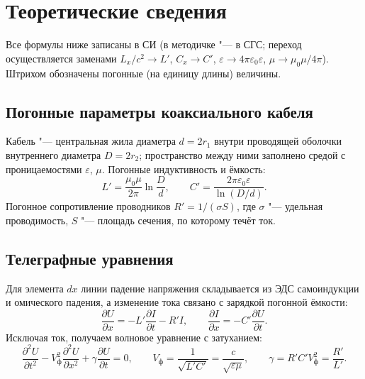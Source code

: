 \documentclass[a4paper,12pt]{article}
\begin{document}
\section{Теоретические сведения}

Все формулы ниже записаны в СИ (в методичке "--- в СГС; переход
осуществляется заменами $L_x/c^2\to L'$, $C_x\to C'$, $\varepsilon\to
4\pi\varepsilon_0\varepsilon$, $\mu\to\mu_0\mu/4\pi$). Штрихом обозначены
погонные (на единицу длины) величины.

\subsection{Погонные параметры коаксиального кабеля}
Кабель "--- центральная жила диаметра $d = 2r_1$ внутри проводящей оболочки
внутреннего диаметра $D = 2r_2$; пространство между ними заполнено средой
с проницаемостями $\varepsilon$, $\mu$. Погонные индуктивность и ёмкость:
\begin{equation}
    \label{eq:LC}
    L' = \frac{\mu_0\mu}{2\pi}\ln\frac{D}{d},
    \qquad
    C' = \frac{2\pi\varepsilon_0\varepsilon}{\ln(D/d)}.
\end{equation}
Погонное сопротивление проводников $R' = 1/(\sigma S)$, где $\sigma$ "---
удельная проводимость, $S$ "--- площадь сечения, по которому течёт ток.

\subsection{Телеграфные уравнения}
Для элемента $dx$ линии падение напряжения складывается из ЭДС
самоиндукции и омического падения, а изменение тока связано с зарядкой
погонной ёмкости:
\begin{equation}
    \label{eq:telegraph}
    \frac{\partial U}{\partial x} = -L'\frac{\partial I}{\partial t} - R'I,
    \qquad
    \frac{\partial I}{\partial x} = -C'\frac{\partial U}{\partial t}.
\end{equation}
Исключая ток, получаем волновое уравнение с затуханием:
\begin{equation}
    \label{eq:wave}
    \frac{\partial^2 U}{\partial t^2}
    - V_\text{ф}^2\frac{\partial^2 U}{\partial x^2}
    + \gamma\frac{\partial U}{\partial t} = 0,
    \qquad
    V_\text{ф} = \frac{1}{\sqrt{L'C'}} = \frac{c}{\sqrt{\varepsilon\mu}},
    \qquad
    \gamma = R'C'V_\text{ф}^2 = \frac{R'}{L'}.
\end{equation}
\end{document}
